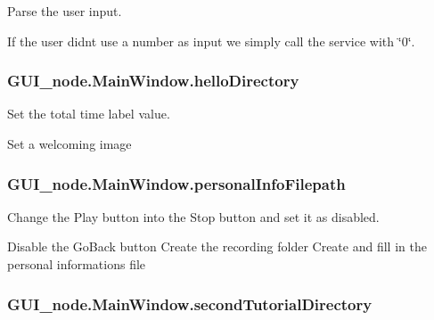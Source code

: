 Parse the user input. 

If the user didn\textquotesingle{}t use a number as input we simply call the service with \char`\"{}0\char`\"{}. 
\subsubsection[{\texorpdfstring{hello\+Directory}{helloDirectory}}]{\setlength{\rightskip}{0pt plus 5cm}G\+U\+I\+\_\+node.\+Main\+Window.\+hello\+Directory}\hypertarget{classGUI__node_1_1MainWindow_aebb76732e473e136740388734928307b}{}\label{classGUI__node_1_1MainWindow_aebb76732e473e136740388734928307b}


Set the total time label value. 

Set a welcoming image 
\subsubsection[{\texorpdfstring{personal\+Info\+Filepath}{personalInfoFilepath}}]{\setlength{\rightskip}{0pt plus 5cm}G\+U\+I\+\_\+node.\+Main\+Window.\+personal\+Info\+Filepath}\hypertarget{classGUI__node_1_1MainWindow_a51c1f3c6822991327e4e0debaedf17f5}{}\label{classGUI__node_1_1MainWindow_a51c1f3c6822991327e4e0debaedf17f5}


Change the Play button into the Stop button and set it as disabled. 

Disable the Go\+Back button Create the recording folder Create and fill in the personal informations file 
\subsubsection[{\texorpdfstring{second\+Tutorial\+Directory}{secondTutorialDirectory}}]{\setlength{\rightskip}{0pt plus 5cm}G\+U\+I\+\_\+node.\+Main\+Window.\+second\+Tutorial\+Directory}\hypertarget{classGUI__node_1_1MainWindow_a4e01d22041049f7266e34d9a59f8cb37}{}\label{classGUI__node_1_1MainWindow_a4e01d22041049f7266e34d9a59f8cb37}


